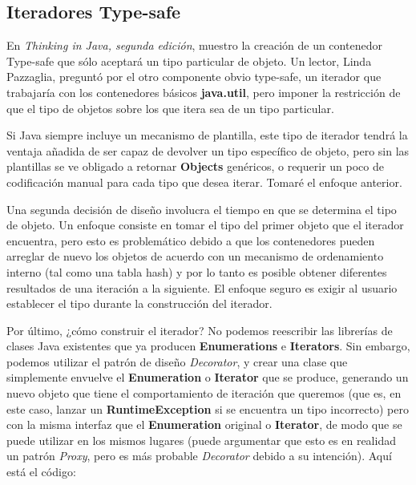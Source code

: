 \subsection*{Iteradores Type-safe}
\label{subsec:icsdt}


En \textit{Thinking in Java, segunda edición}, muestro la creación de un contenedor Type-safe que sólo aceptará un tipo particular de objeto. Un lector, Linda Pazzaglia, preguntó por el otro componente obvio type-safe, un iterador que trabajaría con los contenedores básicos \textbf{java.util}, pero imponer la restricción de que el tipo de objetos sobre los que itera sea de un tipo particular. \newline

Si Java siempre incluye un mecanismo de plantilla, este tipo de iterador tendrá la ventaja añadida de ser capaz de devolver un tipo específico de objeto, pero sin las plantillas se ve obligado a retornar \textbf{Objects} genéricos, o requerir un poco de codificación manual para cada tipo que desea iterar. Tomaré el enfoque anterior.     \newline

Una segunda decisión de diseño involucra el tiempo en que se determina el tipo de objeto. Un enfoque consiste en tomar el tipo del primer objeto que el iterador encuentra, pero esto es problemático debido a que los contenedores pueden arreglar de nuevo los objetos de acuerdo con un mecanismo de ordenamiento interno (tal como una tabla hash) y por lo tanto es posible obtener diferentes resultados de una iteración a la siguiente. El enfoque seguro es exigir al usuario establecer el tipo durante la construcción del iterador.     \newline

Por último, ¿cómo construir el iterador? No podemos reescribir las librerías de clases Java existentes que ya producen \textbf{Enumerations} e \textbf{Iterators}.  Sin embargo, podemos utilizar el patrón de diseño \textit{Decorator}, y crear una clase que simplemente envuelve el \textbf{Enumeration} o \textbf{Iterator} que se produce, generando un nuevo objeto que tiene el comportamiento de iteración que queremos (que es, en este caso, lanzar un \textbf{RuntimeException} si se encuentra un tipo incorrecto) pero con la misma interfaz que el \textbf{Enumeration} original o \textbf{Iterator}, de modo que se puede utilizar en los mismos lugares (puede argumentar que esto es en realidad un patrón \textit{Proxy}, pero es más probable \textit{Decorator} debido a su intención). Aquí está el código: \newline


